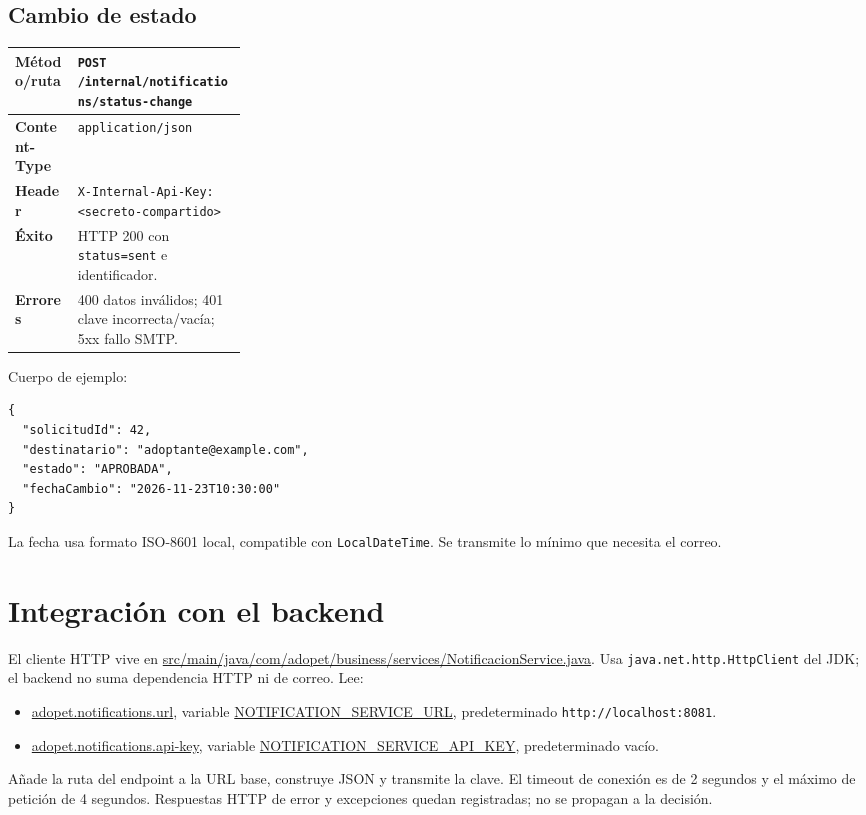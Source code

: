 \documentclass[11pt,a4paper]{article}
\newcommand{\pathcode}[1]{\small\url{#1}}\newcommand{\envvar}[1]{\small\url{#1}}
\begin{document}
\subsection{Cambio de estado}
\begin{tabularx}{\linewidth}{>{\bfseries}p{0.27\linewidth}X}\toprule
Método/ruta & \texttt{POST /internal/notifications/status-change}\\\midrule
Content-Type & \texttt{application/json}\\
Header & \texttt{X-Internal-Api-Key: <secreto-compartido>}\\
Éxito & HTTP 200 con \texttt{status=sent} e identificador.\\
Errores & 400 datos inválidos; 401 clave incorrecta/vacía; 5xx fallo SMTP.\\\bottomrule\end{tabularx}
Cuerpo de ejemplo:
\begin{lstlisting}
{
  "solicitudId": 42,
  "destinatario": "adoptante@example.com",
  "estado": "APROBADA",
  "fechaCambio": "2026-11-23T10:30:00"
}
\end{lstlisting}
La fecha usa formato ISO-8601 local, compatible con \texttt{LocalDateTime}. Se transmite lo mínimo que necesita el correo.

\section{Integración con el backend}
El cliente HTTP vive en \pathcode{src/main/java/com/adopet/business/services/NotificacionService.java}. Usa \texttt{java.net.http.HttpClient} del JDK; el backend no suma dependencia HTTP ni de correo. Lee:
\begin{itemize}
\item \envvar{adopet.notifications.url}, variable \envvar{NOTIFICATION_SERVICE_URL}, predeterminado \texttt{http://localhost:8081}.
\item \envvar{adopet.notifications.api-key}, variable \envvar{NOTIFICATION_SERVICE_API_KEY}, predeterminado vacío.
\end{itemize}
Añade la ruta del endpoint a la URL base, construye JSON y transmite la clave. El timeout de conexión es de 2 segundos y el máximo de petición de 4 segundos. Respuestas HTTP de error y excepciones quedan registradas; no se propagan a la decisión.
\end{document}
